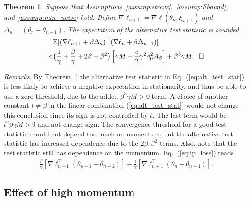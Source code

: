 \documentclass[conference]{IEEEtran}
\newcommand{\Ex}[1]{\mathbb{E}[ #1 ]}
\newtheorem{theorem}{Theorem}
\begin{document}
\begin{theorem}
\label{thm:ip_opt}
Suppose that Assumptions~\ref{assump:strcvx},~\ref{assump:Fbound}, and~\ref{assump:min_noise} hold.
Define $\nabla \ell_{n+1} = \nabla \ell (\theta_n, \xi_{n+1})$ and $\Delta_n = (\theta_n - \theta_{n-1})$.
The expectation of the alternative test statistic is bounded
\begin{align}\label{eq:alt_test_stat}
&\Ex{ ( \nabla \ell _{n+1} + \beta \Delta_n )^\top ( \nabla \ell_n + \beta \Delta_{n-1} ) } \\\notag
<& \big( \frac{1}{\gamma} + \frac{\beta}{\gamma} + 2 \beta + \beta^2 \big) \left[ \gamma M - \frac{c}{2} \gamma^2 \sigma_0^2 A_\beta \right]
+ \beta^3 \gamma M.\hspace{0.1in}\Box
\end{align}
\end{theorem}
\emph{Remarks.}
By Theorem~\ref{thm:ip_opt} the alternative test statistic in Eq.~(\ref{eq:alt_test_stat}) is less likely to achieve a negative expectation in stationarity, and thus be able to use a zero threshold, due to the added $\beta^3 \gamma M > 0$ term.
A choice of another constant $t \neq \beta$ in the linear combination (\ref{eq:alt_test_stat}) would not change this conclusion since its sign is not controlled by $t$.
The last term would be $t^2 \beta \gamma M > 0$ and not change sign.
The convergence threshold for a good test statistic should not depend too much on momentum, but the alternative test statistic has increased dependence due to the $2\beta, \beta^2$ terms. 
Also, note that the test statistic still has dependence on the momentum. 
Eq.~(\ref{eq:ip_loss}) reads
\begin{align}
\label{eq:ip_breakdown}
\frac{\beta}{\gamma} [ \nabla \ell_{n+1}^\top (\theta_{n-1} - \theta_{n-2} ) ]
- \frac{1}{\gamma} [ \nabla \ell_{n+1}^\top ( \theta_n - \theta_{n-1} )].
\end{align}


\subsection{Effect of high momentum}
\end{document}
